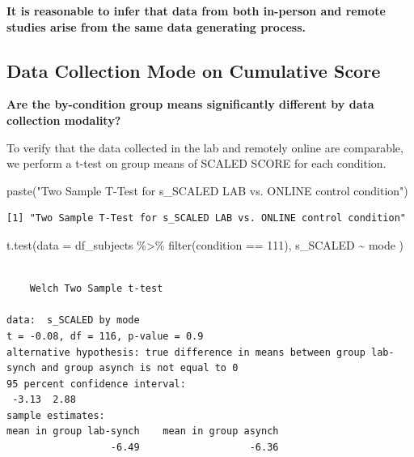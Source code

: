 \documentclass[
  letterpaper,
  DIV=11,
  numbers=noendperiod]{scrreprt}
\newenvironment{Shaded}{\begin{snugshade}}{\end{snugshade}}
\newcommand{\AttributeTok}[1]{\textcolor[rgb]{0.40,0.45,0.13}{#1}}
\newcommand{\DecValTok}[1]{\textcolor[rgb]{0.68,0.00,0.00}{#1}}
\newcommand{\FunctionTok}[1]{\textcolor[rgb]{0.28,0.35,0.67}{#1}}
\newcommand{\NormalTok}[1]{\textcolor[rgb]{0.00,0.23,0.31}{#1}}
\newcommand{\SpecialCharTok}[1]{\textcolor[rgb]{0.37,0.37,0.37}{#1}}
\newcommand{\StringTok}[1]{\textcolor[rgb]{0.13,0.47,0.30}{#1}}
\begin{document}
\begin{tcolorbox}[enhanced jigsaw, toptitle=1mm, toprule=.15mm, bottomtitle=1mm, leftrule=.75mm, title={Decision}, opacityback=0, titlerule=0mm, opacitybacktitle=0.6, colframe=quarto-callout-color-frame, rightrule=.15mm, breakable, bottomrule=.15mm, colbacktitle=quarto-callout-color!10!white, coltitle=black, arc=.35mm, colback=white, left=2mm]
\textbf{It is reasonable to infer that data from both in-person and
remote studies arise from the same data generating process.}
\end{tcolorbox}

\hypertarget{data-collection-mode-on-cumulative-score}{%
\subsection{Data Collection Mode on Cumulative
Score}\label{data-collection-mode-on-cumulative-score}}

\textbf{Are the by-condition group means significantly different by data
collection modality?}

To verify that the data collected in the lab and remotely online are
comparable, we perform a t-test on group means of SCALED SCORE for each
condition.

\begin{Shaded}
\begin{Highlighting}[]
\FunctionTok{paste}\NormalTok{(}\StringTok{"Two Sample T{-}Test for s\_SCALED LAB vs. ONLINE control condition"}\NormalTok{)}
\end{Highlighting}
\end{Shaded}

\begin{verbatim}
[1] "Two Sample T-Test for s_SCALED LAB vs. ONLINE control condition"
\end{verbatim}

\begin{Shaded}
\begin{Highlighting}[]
\FunctionTok{t.test}\NormalTok{(}\AttributeTok{data =}\NormalTok{ df\_subjects }\SpecialCharTok{\%\textgreater{}\%} \FunctionTok{filter}\NormalTok{(condition }\SpecialCharTok{==} \DecValTok{111}\NormalTok{), s\_SCALED }\SpecialCharTok{\textasciitilde{}}\NormalTok{ mode )}
\end{Highlighting}
\end{Shaded}

\begin{verbatim}

    Welch Two Sample t-test

data:  s_SCALED by mode
t = -0.08, df = 116, p-value = 0.9
alternative hypothesis: true difference in means between group lab-synch and group asynch is not equal to 0
95 percent confidence interval:
 -3.13  2.88
sample estimates:
mean in group lab-synch    mean in group asynch 
                  -6.49                   -6.36 
\end{verbatim}
\end{document}
